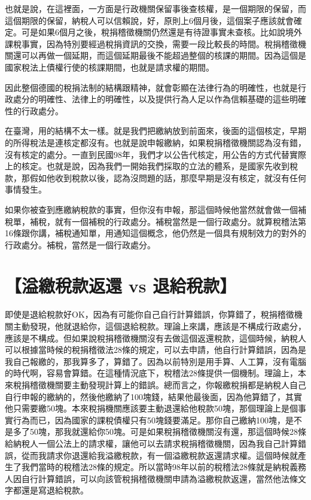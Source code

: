 \documentclass[]{ctexbook}
\begin{document}
也就是說，在這裡面，一方面是行政機關保留事後查核權，是一個期限的保留，而這個期限的保留，納稅人可以信賴說，好，原則上6個月後，這個案子應該就會確定。可是如果6個月之後，稅捐稽徵機關仍然還是有待證事實未查核。比如說境外課稅事實，因為特別要經過稅捐資訊的交換，需要一段比較長的時間。稅捐稽徵機關還可以再做一個延期，而這個延期最後不能超過整個的核課的期間。因為這個是國家稅法上債權行使的核課期間，也就是請求權的期間。

因此整個德國的稅捐法制的結構跟精神，就會彰顯在法律行為的明確性，也就是行政處分的明確性、法律上的明確性，以及提供行為人足以作為信賴基礎的這些明確性的行政處分。

在臺灣，用的結構不太一樣。就是我們把繳納放到前面來，後面的這個核定，早期的所得稅法是連核定都沒有。也就是說申報繳納，如果稅捐稽徵機關認為沒有錯，沒有核定的處分。一直到民國98年，我們才以公告代核定，用公告的方式代替實際上的核定。也就是說，因為我們一開始我們採取的立法的體系，是國家先收到稅款，那假如他收到稅款以後，認為沒問題的話，那麼早期是沒有核定，就沒有任何事情發生。

如果你被查到應繳納稅款的事實，但你沒有申報，那這個時候他當然就會做一個補稅單，補稅，就有一個補稅的行政處分。補稅當然是一個行政處分。就算稅稽法第16條跟你講，補稅通知單，用通知這個概念，他仍然是一個具有規制效力的對外的行政處分。補稅，當然是一個行政處分。

\hypertarget{ux6ea2ux7e73ux7a05ux6b3eux8fd4ux9084-vs-ux9000ux7d66ux7a05ux6b3e}{%
\section{【溢繳稅款返還 vs 退給稅款】}\label{ux6ea2ux7e73ux7a05ux6b3eux8fd4ux9084-vs-ux9000ux7d66ux7a05ux6b3e}}

即使是退給稅款好OK，因為有可能你自己自行計算錯誤，你算錯了，稅捐稽徵機關主動發現，他就退給你，這個退給稅款。理論上來講，應該是不構成行政處分，應該是不構成。但如果說稅捐稽徵機關沒有去做這個返還稅款，這個時候，納稅人可以根據當時候的稅捐稽徵法28條的規定，可以去申請，他自行計算錯誤，因為是我自己報繳的，那我算多了，算錯了。因為以前特別是用手算、人工算，沒有電腦的時代啊，容易會算錯。在這種情況底下，稅稽法28條提供一個機制。理論上，本來稅捐稽徵機關要主動發現計算上的錯誤。總而言之，你報繳稅捐都是納稅人自己自行申報的繳納的，然後他繳納了100塊錢，結果他最後面，因為他算錯了，其實他只需要繳50塊。本來稅捐機關應該要主動退還給他稅款50塊，那個理論上是個事實行為而已，因為國家的課稅債權只有50塊錢要滿足。那你自己繳納100塊，是不是多了50塊，那我就還給你50塊。可是如果稅捐稽徵機關沒有還，那這個時候28條給納稅人一個公法上的請求權，讓他可以去請求稅捐稽徵機關，因為我自己計算錯誤，從而我請求你退還給我溢繳稅款，有一個溢繳稅款返還請求權。這個時候就產生了我們當時的稅稽法28條的規定。所以當時98年以前的稅稽法28條就是納稅義務人因自行計算錯誤，可以向該管稅捐稽徵機關申請為溢繳稅款返還，當然他法條文字都還是寫退給稅款。
\end{document}
